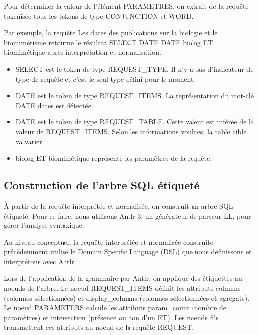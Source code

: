 \documentclass[a4paper]{elsarticle}
\begin{document}
Pour déterminer la valeur de l'élément PARAMETRES, on extrait de la requête tokenisée tous les tokens de type CONJUNCTION et WORD.

Par exemple, la requête \og Les dates des publications sur la biologie et le biomimétisme \fg{} retourne le résultat \og SELECT DATE DATE biolog ET biomimétique \fg{} après interprétation et normalisation.

\begin{itemize}
\item SELECT est le token de type REQUEST\_TYPE. Il n'y a pas d'indicateur de type de requête et c'est le seul type défini pour le moment.
\item DATE est le token de type REQUEST\_ITEMS. La représentation du mot-clé DATE \og dates \fg{} est détectée.
\item DATE est le token de type REQUEST\_TABLE. Cette valeur est inférée de la valeur de REQUEST\_ITEMS. Selon les informations voulues, la table cible va varier.
\item \og biolog ET biomimétique \fg{} représente les paramètres de la requête.
\end{itemize}

\subsection{Construction de l'arbre SQL étiqueté}

\`A partir de la requête interprétée et normalisée, on construit un arbre SQL étiqueté. Pour ce faire, nous utilisons Antlr 3, un générateur de parseur LL, pour gérer l'analyse syntaxique.

Au niveau conceptuel, la requête interprétée et normalisée construite précédemment utilise le Domain Specific Language (DSL) que nous définissons et interprétons avec Antlr.

Lors de l'application de la grammaire par Antlr, on applique des étiquettes au noeuds de l'arbre. Le noeud REQUEST\_ITEMS définit les attributs columns (colonnes sélectionnées) et display\_columns (colonnes sélectionnées et agrégats). Le noeud PARAMETERS calcule les attributs param\_count (nombre de paramètres) et intersection (présence ou non d'un ET).
Les noeuds fils transmettent ces attributs au noeud de la requête REQUEST.
\end{document}
